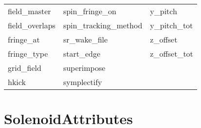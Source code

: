 \begin{tabular}{lll}
field_master                & spin_fringe_on              & y_pitch                     \\
field_overlaps              & spin_tracking_method        & y_pitch_tot                 \\
fringe_at                   & sr_wake_file                & z_offset                    \\
fringe_type                 & start_edge                  & z_offset_tot                \\
grid_field                  & superimpose                 &                             \\
hkick                       & symplectify                 &                             \\
 \bottomrule
 \end{tabular}
 \vfill
 
 \section{SolenoidAttributes}
 \label{s:list.solenoid}
 
